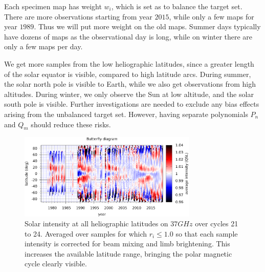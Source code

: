 \documentclass{aa}
\begin{document}
Each specimen map has weight $w_i$, which is set as to balance the target set. 
There are more 
observations starting from year $2015$, while only a few maps for year $1989$. 
Thus we will put more weight on the old 
maps. Summer days typically have dozens of maps as the observational day is long, while on winter there are only a few maps per day.

We get more samples from the low heliographic latitudes, since a greater length of the solar equator is visible, 
compared to high latitude arcs. During summer, the solar north pole is visible to Earth, while we also get observations 
from high altitudes. During winter, we only observe the Sun at low altitude, and the solar south pole is visible. 
Further investigations are needed to exclude any bias effects arising from the unbalanced target set. However, having 
separate polynomials $P_n$ and $Q_m$ should reduce these risks. 
\begin{figure}
\centering
\includegraphics[width=8.5cm]{butterfly_clear_limb.png}
\caption{Solar intensity at all heliographic latitudes on $\si{37}{GHz}$ over cycles 21 to 24. Averaged over samples for which $r_i \le 1.0$ so that each sample intensity is corrected for beam mixing and limb brightening. This increases the available latitude range, bringing the polar magnetic cycle clearly visible.}
\label{butterfly_clear_corr}
\end{figure}
\end{document}
